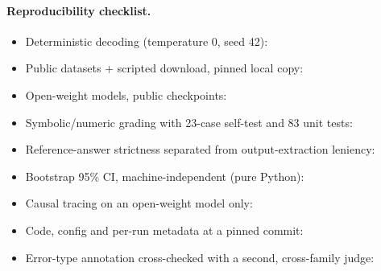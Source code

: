 \paragraph{Reproducibility checklist.}
\begin{itemize}
  \item Deterministic decoding (temperature 0, seed 42): \checkmark
  \item Public datasets + scripted download, pinned local copy: \checkmark
  \item Open-weight models, public checkpoints: \checkmark
  \item Symbolic/numeric grading with 23-case self-test and 83 unit tests: \checkmark
  \item Reference-answer strictness separated from output-extraction leniency: \checkmark
  \item Bootstrap 95\% CI, machine-independent (pure Python): \checkmark
  \item Causal tracing on an open-weight model only: \checkmark
  \item Code, config and per-run metadata at a pinned commit: \checkmark
  \item Error-type annotation cross-checked with a second, cross-family judge: \checkmark
\end{itemize}

